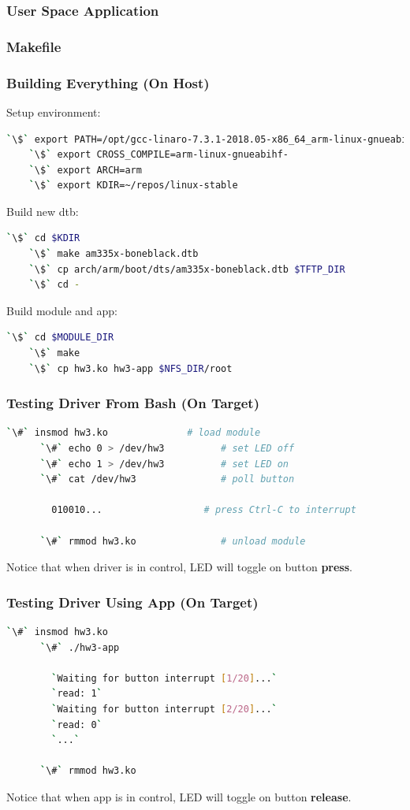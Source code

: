 \documentclass[aspectratio=169,usenames,dvipsnames]{beamer}
\newcounter{cont}
\begin{document}
\begin{frame}[containsverbatim,allowframebreaks=1]
  \frametitle{User Space Application}
  
\end{frame}

\begin{frame}[containsverbatim]
  \frametitle{Makefile}
  
  \vspace*{-5mm}
\end{frame}

\begin{frame}[containsverbatim]
  \frametitle{Building Everything (On Host)}
  Setup environment:
  \begin{lstlisting}[language=bash,numbers=none]
    `\$` export PATH=/opt/gcc-linaro-7.3.1-2018.05-x86_64_arm-linux-gnueabihf/bin:$PATH
    `\$` export CROSS_COMPILE=arm-linux-gnueabihf-
    `\$` export ARCH=arm
    `\$` export KDIR=~/repos/linux-stable
  \end{lstlisting}
  Build new dtb:
  \begin{lstlisting}[language=bash,numbers=none]
    `\$` cd $KDIR
    `\$` make am335x-boneblack.dtb
    `\$` cp arch/arm/boot/dts/am335x-boneblack.dtb $TFTP_DIR
    `\$` cd -
  \end{lstlisting}
  Build module and app:
  \begin{lstlisting}[language=bash,numbers=none]
    `\$` cd $MODULE_DIR
    `\$` make
    `\$` cp hw3.ko hw3-app $NFS_DIR/root
  \end{lstlisting}
\end{frame}

\begin{frame}[containsverbatim]
  \frametitle{Testing Driver From Bash (On Target)}
  \begin{lstlisting}[language=bash,numbers=none]
      `\#` insmod hw3.ko              # load module
      `\#` echo 0 > /dev/hw3          # set LED off
      `\#` echo 1 > /dev/hw3          # set LED on
      `\#` cat /dev/hw3               # poll button

        010010...                  # press Ctrl-C to interrupt

      `\#` rmmod hw3.ko               # unload module
  \end{lstlisting}
  Notice that when driver is in control, LED will toggle on button
  \textbf{press}.
\end{frame}

\begin{frame}[containsverbatim]
  \frametitle{Testing Driver Using App (On Target)}
  \begin{lstlisting}[language=bash,numbers=none]
      `\#` insmod hw3.ko
      `\#` ./hw3-app

        `Waiting for button interrupt [1/20]...`
        `read: 1`
        `Waiting for button interrupt [2/20]...`
        `read: 0`
        `...`

      `\#` rmmod hw3.ko
  \end{lstlisting}
  Notice that when app is in control, LED will toggle on button
  \textbf{release}.
\end{frame}
\end{document}
